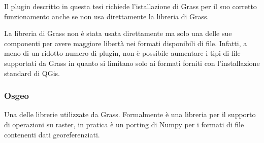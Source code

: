 Il plugin descritto in questa tesi richiede l'istallazione di Grass per il suo corretto funzionamento anche se non usa direttamente la libreria di Grass.

La libreria di Grass non è stata usata direttamente ma solo una delle sue componenti per avere maggiore libertà nei formati disponibili di file. Infatti, a meno di un ridotto numero di plugin, non è possibile aumentare i tipi di file supportati da Grass in quanto si limitano solo ai formati forniti con l'installazione standard di QGis.

\subsubsection{Osgeo}
Una delle librerie utilizzate da Grass. Formalmente è una libreria per il supporto di operazioni su raster, in pratica è un porting di Numpy per i formati di file contenenti dati georeferenziati.

